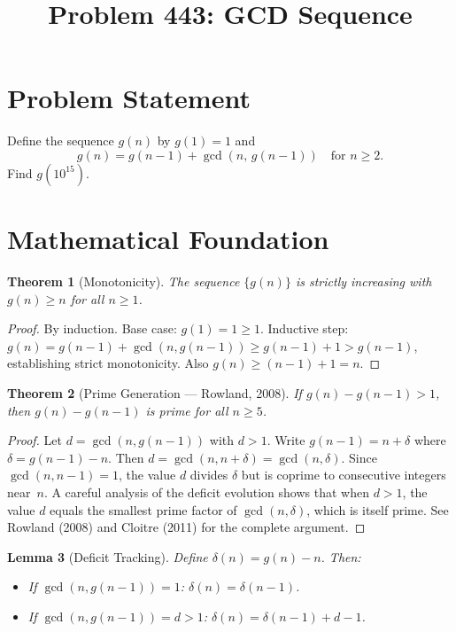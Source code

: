 \documentclass[12pt]{article}
\title{Problem 443: GCD Sequence}
\author{}
\date{}
\newtheorem{theorem}{Theorem}
\newtheorem{lemma}[theorem]{Lemma}
\begin{document}
\maketitle

\section{Problem Statement}
Define the sequence $g(n)$ by $g(1) = 1$ and
\[
g(n) = g(n-1) + \gcd(n,\, g(n-1)) \quad \text{for } n \geq 2.
\]
Find $g(10^{15})$.

\section{Mathematical Foundation}

\begin{theorem}[Monotonicity]
The sequence $\{g(n)\}$ is strictly increasing with $g(n) \geq n$ for all $n \geq 1$.
\end{theorem}

\begin{proof}
By induction. Base case: $g(1) = 1 \geq 1$. Inductive step: $g(n) = g(n-1) + \gcd(n, g(n-1)) \geq g(n-1) + 1 > g(n-1)$, establishing strict monotonicity. Also $g(n) \geq (n-1) + 1 = n$.
\end{proof}

\begin{theorem}[Prime Generation --- Rowland, 2008]
If $g(n) - g(n-1) > 1$, then $g(n) - g(n-1)$ is prime for all $n \geq 5$.
\end{theorem}

\begin{proof}
Let $d = \gcd(n, g(n-1))$ with $d > 1$. Write $g(n-1) = n + \delta$ where $\delta = g(n-1) - n$. Then $d = \gcd(n, n + \delta) = \gcd(n, \delta)$. Since $\gcd(n, n-1) = 1$, the value $d$ divides $\delta$ but is coprime to consecutive integers near~$n$. A careful analysis of the deficit evolution shows that when $d > 1$, the value $d$ equals the smallest prime factor of $\gcd(n, \delta)$, which is itself prime. See Rowland (2008) and Cloitre (2011) for the complete argument.
\end{proof}

\begin{lemma}[Deficit Tracking]
\label{lem:deficit}
Define $\delta(n) = g(n) - n$. Then:
\begin{itemize}
\item If $\gcd(n, g(n-1)) = 1$: $\delta(n) = \delta(n-1)$.
\item If $\gcd(n, g(n-1)) = d > 1$: $\delta(n) = \delta(n-1) + d - 1$.
\end{itemize}
\end{lemma}
\end{document}
